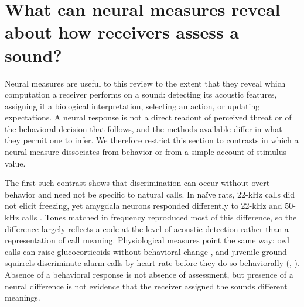 \section{What can neural measures reveal about how receivers assess a sound?}
\label{sec:q3}


Neural measures are useful to this review to the extent that they reveal which computation a receiver performs on a sound: detecting its acoustic features, assigning it a biological interpretation, selecting an action, or updating expectations. A neural response is not a direct readout of perceived threat or of the behavioral decision that follows, and the methods available differ in what they permit one to infer. We therefore restrict this section to contrasts in which a neural measure dissociates from behavior or from a simple account of stimulus value.

The first such contrast shows that discrimination can occur without overt behavior and need not be specific to natural calls. In naïve rats, 22-kHz calls did not elicit freezing, yet amygdala neurons responded differently to 22-kHz and 50-kHz calls \citep{ParsanaEtAl2012a}. Tones matched in frequency reproduced most of this difference, so the difference largely reflects a code at the level of acoustic detection rather than a representation of call meaning.
Physiological measures point the same way: owl calls can raise glucocorticoids without behavioral change \citep{EilamEtAl1999}, and juvenile ground squirrels discriminate alarm calls by heart rate before they do so behaviorally \citep{Mateo1996} (, ). Absence of a behavioral response is not absence of assessment, but presence of a neural difference is not evidence that the receiver assigned the sounds different meanings.

